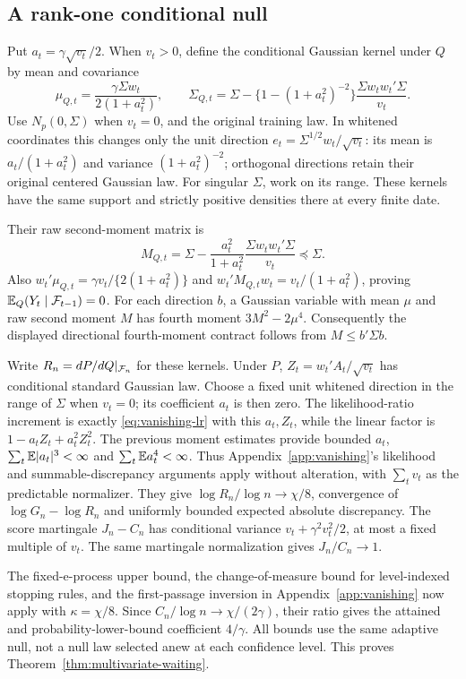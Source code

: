 \subsection{A rank-one conditional null}
Put $a_t=\gamma\sqrt{v_t}/2$. When $v_t>0$, define the conditional Gaussian
kernel under $Q$ by mean and covariance
\[
 \mu_{Q,t}=\frac{\gamma\Sigma w_t}{2(1+a_t^2)},\qquad
 \Sigma_{Q,t}=\Sigma-
 \{1-(1+a_t^2)^{-2}\}\frac{\Sigma w_tw_t'\Sigma}{v_t}.
\]
Use $N_p(0,\Sigma)$ when $v_t=0$, and the original training law. In whitened
coordinates this changes only the unit direction
$e_t=\Sigma^{1/2}w_t/\sqrt{v_t}$: its mean is $a_t/(1+a_t^2)$ and variance
$(1+a_t^2)^{-2}$; orthogonal directions retain their original centered
Gaussian law. For singular $\Sigma$, work on its range. These kernels have
the same support and strictly positive densities there at every finite date.

Their raw second-moment matrix is
\[
 M_{Q,t}=\Sigma-\frac{a_t^2}{1+a_t^2}
                    \frac{\Sigma w_tw_t'\Sigma}{v_t}\preceq\Sigma.
\]
Also $w_t'\mu_{Q,t}=\gamma v_t/\{2(1+a_t^2)\}$ and
$w_t'M_{Q,t}w_t=v_t/(1+a_t^2)$, proving $\mathbb E_Q(Y_t\mid\mathcal F_{t-1})=0$.
For each direction $b$, a Gaussian variable with mean $\mu$ and raw second
moment $M$ has fourth moment $3M^2-2\mu^4$. Consequently the displayed
directional fourth-moment contract follows from $M\le b'\Sigma b$.

Write $R_n=dP/dQ|_{\mathcal F_n}$ for these kernels.
Under $P$, $Z_t=w_t'A_t/\sqrt{v_t}$ has conditional standard Gaussian law.
Choose a fixed unit whitened direction in the range of $\Sigma$ when $v_t=0$; its coefficient
$a_t$ is then zero. The likelihood-ratio increment is exactly
\eqref{eq:vanishing-lr} with this $a_t,Z_t$, while the linear factor is
$1-a_tZ_t+a_t^2Z_t^2$. The previous moment estimates provide bounded $a_t$,
$\sum_t\mathbb E|a_t|^3<\infty$ and $\sum_t\mathbb E a_t^4<\infty$.
Thus Appendix~\ref{app:vanishing}'s likelihood and summable-discrepancy
arguments apply without alteration, with $\sum_t v_t$ as the predictable
normalizer. They give $\log R_n/\log n\to\chi/8$, convergence of
$\log G_n-\log R_n$ and uniformly bounded expected absolute discrepancy.
The score martingale $J_n-C_n$ has conditional variance
$v_t+\gamma^2v_t^2/2$, at most a fixed multiple of $v_t$.
The same martingale normalization gives $J_n/C_n\to1$.

The fixed-e-process upper bound, the change-of-measure bound for
level-indexed stopping rules, and the first-passage inversion in
Appendix~\ref{app:vanishing} now apply with $\kappa=\chi/8$.
Since $C_n/\log n\to\chi/(2\gamma)$, their ratio gives the attained and
probability-lower-bound coefficient $4/\gamma$. All bounds use the same
adaptive null, not a null law selected anew at each confidence level.
This proves Theorem~\ref{thm:multivariate-waiting}.

